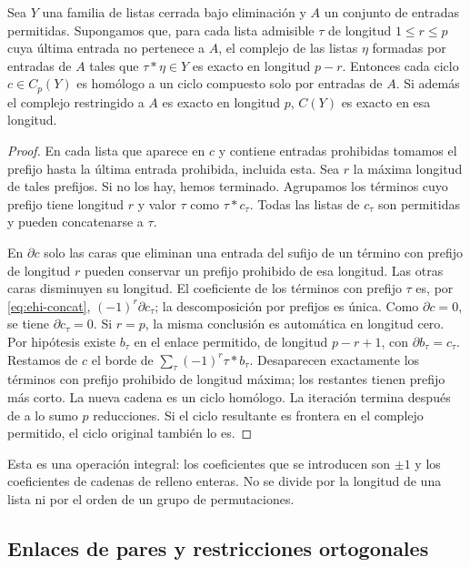 \begin{lema}
\label{lem:ehi-prefix}
Sea $Y$ una familia de listas cerrada bajo eliminación y $A$ un conjunto de entradas permitidas. Supongamos que, para cada lista admisible $\tau$ de longitud $1\le r\le p$ cuya última entrada no pertenece a $A$, el complejo de las listas $\eta$ formadas por entradas de $A$ tales que $\tau*\eta\in Y$ es exacto en longitud $p-r$. Entonces cada ciclo $c\in C_p(Y)$ es homólogo a un ciclo compuesto solo por entradas de $A$. Si además el complejo restringido a $A$ es exacto en longitud $p$, $C(Y)$ es exacto en esa longitud.
\end{lema}
\begin{proof}
En cada lista que aparece en $c$ y contiene entradas prohibidas tomamos el prefijo hasta la última entrada prohibida, incluida esta. Sea $r$ la máxima longitud de tales prefijos. Si no los hay, hemos terminado. Agrupamos los términos cuyo prefijo tiene longitud $r$ y valor $\tau$ como $\tau*c_\tau$. Todas las listas de $c_\tau$ son permitidas y pueden concatenarse a $\tau$.

En $\partial c$ solo las caras que eliminan una entrada del sufijo de un término con prefijo de longitud $r$ pueden conservar un prefijo prohibido de esa longitud. Las otras caras disminuyen su longitud. El coeficiente de los términos con prefijo $\tau$ es, por \eqref{eq:ehi-concat}, $(-1)^r\partial c_\tau$; la descomposición por prefijos es única. Como $\partial c=0$, se tiene $\partial c_\tau=0$. Si $r=p$, la misma conclusión es automática en longitud cero. Por hipótesis existe $b_\tau$ en el enlace permitido, de longitud $p-r+1$, con $\partial b_\tau=c_\tau$. Restamos de $c$ el borde de $\sum_\tau(-1)^r\tau*b_\tau$. Desaparecen exactamente los términos con prefijo prohibido de longitud máxima; los restantes tienen prefijo más corto. La nueva cadena es un ciclo homólogo. La iteración termina después de a lo sumo $p$ reducciones. Si el ciclo resultante es frontera en el complejo permitido, el ciclo original también lo es.
\end{proof}

Esta es una operación integral: los coeficientes que se introducen son $\pm1$ y los coeficientes de cadenas de relleno enteras. No se divide por la longitud de una lista ni por el orden de un grupo de permutaciones.

\subsection{Enlaces de pares y restricciones ortogonales}

